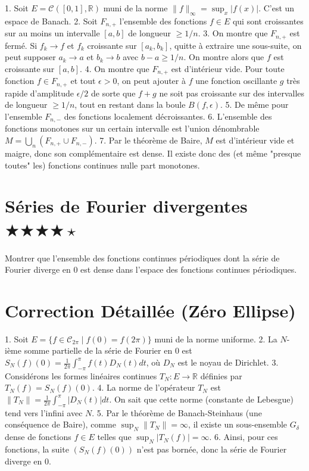 \documentclass[11pt,a4paper]{article}
\begin{document}
1. Soit $E = \mathcal{C}([0,1], \mathbb{R})$ muni de la norme $\|f\|_\infty = \sup_{x} |f(x)|$. C'est un espace de Banach.
2. Soit $F_{n, +}$ l'ensemble des fonctions $f \in E$ qui sont croissantes sur au moins un intervalle $[a, b]$ de longueur $\geq 1/n$.
3. On montre que $F_{n, +}$ est fermé. Si $f_k \to f$ et $f_k$ croissante sur $[a_k, b_k]$, quitte à extraire une sous-suite, on peut supposer $a_k \to a$ et $b_k \to b$ avec $b-a \geq 1/n$. On montre alors que $f$ est croissante sur $[a, b]$.
4. On montre que $F_{n, +}$ est d'intérieur vide. Pour toute fonction $f \in F_{n, +}$ et tout $\epsilon > 0$, on peut ajouter à $f$ une fonction oscillante $g$ très rapide d'amplitude $\epsilon/2$ de sorte que $f+g$ ne soit pas croissante sur des intervalles de longueur $\geq 1/n$, tout en restant dans la boule $B(f, \epsilon)$.
5. De même pour l'ensemble $F_{n, -}$ des fonctions localement décroissantes.
6. L'ensemble des fonctions monotones sur un certain intervalle est l'union dénombrable $M = \bigcup_{n} (F_{n, +} \cup F_{n, -})$.
7. Par le théorème de Baire, $M$ est d'intérieur vide et maigre, donc son complémentaire est dense. Il existe donc des (et même "presque toutes" les) fonctions continues nulle part monotones.


\newpage

\section{Séries de Fourier divergentes \quad $\bigstar\bigstar\bigstar\bigstar\star$}

Montrer que l'ensemble des fonctions continues périodiques dont la série de Fourier diverge en 0 est dense dans l'espace des fonctions continues périodiques.

\section{Correction Détaillée (Zéro Ellipse)}


1. Soit $E = \{f \in \mathcal{C}_{2\pi} \mid f(0) = f(2\pi)\}$ muni de la norme uniforme.
2. La $N$-ième somme partielle de la série de Fourier en 0 est $S_N(f)(0) = \frac{1}{2\pi} \int_{-\pi}^{\pi} f(t) D_N(t) dt$, où $D_N$ est le noyau de Dirichlet.
3. Considérons les formes linéaires continues $T_N : E \to \mathbb{R}$ définies par $T_N(f) = S_N(f)(0)$.
4. La norme de l'opérateur $T_N$ est $\|T_N\| = \frac{1}{2\pi} \int_{-\pi}^{\pi} |D_N(t)| dt$. On sait que cette norme (constante de Lebesgue) tend vers l'infini avec $N$.
5. Par le théorème de Banach-Steinhaus (une conséquence de Baire), comme $\sup_N \|T_N\| = \infty$, il existe un sous-ensemble $G_\delta$ dense de fonctions $f \in E$ telles que $\sup_N |T_N(f)| = \infty$.
6. Ainsi, pour ces fonctions, la suite $(S_N(f)(0))$ n'est pas bornée, donc la série de Fourier diverge en 0.
\end{document}
